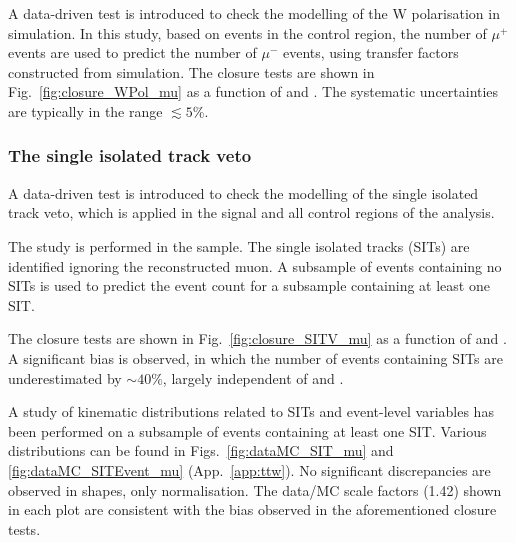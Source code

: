 A data-driven test is introduced to check the modelling of the W
polarisation in simulation.  In this study, based on events in the \mj
control region, the number of $\mu^{+}$ events are used to predict the
number of $\mu^{-}$ events, using transfer factors constructed from
simulation. 
The closure tests are shown in Fig.~\ref{fig:closure_WPol_mu} as a
function of \scalht and \njet. The systematic uncertainties are
typically in the range $\lesssim 5\%$.

\subsubsection{The single isolated track veto}
\label{sec:tfSyst_SITV}

A data-driven test is introduced to check the modelling of the single
isolated track veto, which is applied in the signal and all control
regions of the analysis.

The study is performed in the \mj sample. The single isolated tracks
(SITs) are identified ignoring the reconstructed muon. A subsample of
events containing no SITs is used to predict the event count for a
subsample containing at least one SIT. 

The closure tests are shown in Fig.~\ref{fig:closure_SITV_mu} as a
function of \scalht and \njet. A significant bias is observed, in
which the number of events containing SITs are underestimated by $\sim
40\%$, largely independent of \scalht and \njet. 

A study of kinematic distributions related to SITs and event-level
variables has been performed on a subsample of \mj events containing
at least one SIT. Various distributions can be found in
Figs.~\ref{fig:dataMC_SIT_mu} and \ref{fig:dataMC_SITEvent_mu}
(App.~\ref{app:ttw}). No significant discrepancies are observed in
shapes, only normalisation. The data/MC scale factors (1.42) shown in
each plot are consistent with the bias observed in the aforementioned
closure tests.








